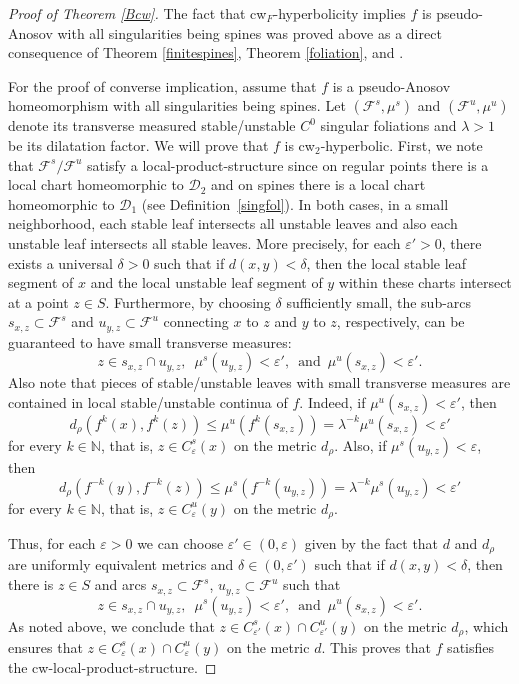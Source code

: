 \documentclass{amsart}
\theoremstyle{plain}
\theoremstyle{definition}
\newcommand{\mc}{\mathcal}
\newcommand{\N}{\mathbb{N}}
\newcommand{\eps}{\varepsilon}
\begin{document}
\begin{proof}[Proof of Theorem \ref{Bcw}]
The fact that cw$_F$-hyperbolicity implies $f$ is pseudo-Anosov with all singularities being spines was proved above as a direct consequence of Theorem \ref{finitespines}, Theorem \ref{foliation}, and \cite[Proposition B]{H}. 

For the proof of converse implication, assume that $f$ is a pseudo-Anosov homeomorphism with all singularities being spines. Let $(\mc{F}^s,\mu^s)$ and $(\mc{F}^u,\mu^u)$ denote its transverse measured stable/unstable $C^0$ singular foliations and $\lambda>1$ be its dilatation factor. We will prove that $f$ is cw$_2$-hyperbolic. First, we note that $\mc{F}^s/\mc{F}^u$ satisfy a local-product-structure since on regular points there is a local chart homeomorphic to $\mc{D}_2$ and on spines there is a local chart homeomorphic to $\mc{D}_1$ (see Definition~\ref{singfol}). In both cases, in a small neighborhood, each stable leaf intersects all unstable leaves and also each unstable leaf intersects all stable leaves.  More precisely, for each $\eps' > 0$, there exists a universal $\delta > 0$ such that if $d(x,y) < \delta$, then the local stable leaf segment of $x$ and the local unstable leaf segment of $y$ within these charts intersect at a point $z \in S$. Furthermore, by choosing $\delta$ sufficiently small, the sub-arcs $s_{x,z} \subset \mc{F}^s$ and $u_{y,z} \subset \mc{F}^u$ connecting $x$ to $z$ and $y$ to $z$, respectively, can be guaranteed to have small transverse measures:
$$z\in s_{x,z}\cap u_{y,z}, \,\,\, \mu^s(u_{y,z})<\eps', \,\,\, \text{and} \,\,\, \mu^u(s_{x,z})<\eps'.$$
Also note that pieces of stable/unstable leaves with small transverse measures are contained in local stable/unstable continua of $f$. Indeed, 
if $\mu^u(s_{x,z})<\eps'$, then
$$d_\rho(f^k(x),f^k(z))\leq\mu^u(f^k(s_{x,z}))=\lambda^{-k}\mu^u(s_{x,z})<\eps'$$
for every $k\in\N$, that is, $z\in C^s_{\eps}(x)$ on the metric $d_{\rho}$. Also, if 
$\mu^s(u_{y,z})<\eps$, then
$$d_\rho(f^{-k}(y),f^{-k}(z))\leq\mu^s(f^{-k}(u_{y,z}))=\lambda^{-k}\mu^s(u_{y,z})<\eps'$$
for every $k\in\N$, that is, $z\in C^u_{\eps}(y)$ on the metric $d_{\rho}$.

Thus, for each $\eps>0$ we can choose $\eps'\in(0,\eps)$ given by the fact that $d$ and $d_{\rho}$ are uniformly equivalent metrics and $\delta\in(0,\eps')$ such that if $d(x,y)<\delta$, then there is $z\in S$ and arcs $s_{x,z}\subset\mc{F}^s$, $u_{y,z}\subset\mc{F}^u$ such that 
$$z\in s_{x,z}\cap u_{y,z}, \,\,\, \mu^s(u_{y,z})<\eps', \,\,\, \text{and} \,\,\, \mu^u(s_{x,z})<\eps'.$$ 
As noted above, we conclude that $z\in C^s_{\eps'}(x)\cap C^u_{\eps'}(y)$ on the metric $d_{\rho}$, which ensures that $z\in C^s_{\eps}(x)\cap C^u_{\eps}(y)$ on the metric $d$. This proves that $f$ satisfies the cw-local-product-structure.


\end{proof}
\end{document}
